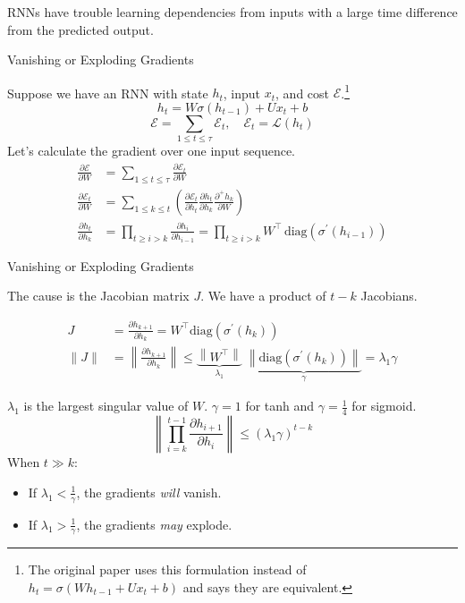 \documentclass[english]{article}
\begin{document}
RNNs have trouble learning dependencies from inputs with a large time difference from the predicted output.
 

\item 
 {Vanishing or Exploding Gradients}

Suppose we have an RNN with state $h_t$, input $x_t$, and cost $\mathcal{E}$.\footnote{The original paper uses this formulation instead of $h_t=\sigma(Wh_{t-1}+Ux_t+b)$ and says they are equivalent.}
$$h_t = W\sigma(h_{t-1})+Ux_t+b$$
$$\mathcal{E}=\sum_{1\leq t\leq \tau}\mathcal{E}_t,\quad \mathcal{E}_t=\mathcal{L}(h_t)$$
Let's calculate the gradient over one input sequence.
\begin{align*}
\frac{\partial\mathcal{E}}{\partial W} &= \sum_{1\leq t\leq\tau} \frac{\partial\mathcal{E}_t}{\partial W}\\
\frac{\partial\mathcal{E}_t}{\partial W} &= \sum_{1\leq k \leq t} \left(\frac{\partial\mathcal{E}_t}{\partial h_t}\frac{\partial h_t}{\partial h_k}\frac{\partial^+h_k}{\partial W}\right)\\
\frac{\partial h_t}{\partial h_k} &= \prod_{t\geq i>k}\frac{\partial h_i}{\partial h_{i-1}}=\prod_{t\geq i>k} {W}^\top\,\text{diag}(\sigma^\prime(h_{i-1}))
\end{align*}
 

\item 
 {Vanishing or Exploding Gradients}

The cause is the Jacobian matrix $J$. We have a product of $t-k$ Jacobians.

\begin{align*}
J&=\frac{\partial h_{k+1}}{\partial h_k}=W^\top\text{diag}(\sigma^\prime(h_k))\\
\|J\|&=\left\|\frac{\partial h_{k+1}}{\partial h_k}\right\|\leq\underbrace{\left\|W^\top\right\|}_{\lambda_1}\;\underbrace{\left\|\text{diag}(\sigma^\prime(h_k))\right\|}_{\gamma}=\lambda_1\gamma
\end{align*}

$\lambda_1$ is the largest singular value of $W$. $\gamma=1$ for tanh and $\gamma=\frac{1}{4}$ for sigmoid.
$$\left\|\prod_{i=k}^{t-1}\frac{\partial h_{i+1}}{\partial h_i}\right\| \leq (\lambda_1\gamma)^{t-k}$$
When $t \gg k$:
\begin{itemize}
\item
If $\lambda_1<\frac{1}{\gamma}$, the gradients \textit{will} vanish.
\item
If $\lambda_1>\frac{1}{\gamma}$, the gradients \textit{may} explode.
\end{itemize}
 
\end{document}
